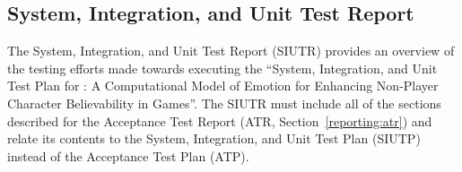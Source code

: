 \subsection{System, Integration, and Unit Test Report}\label{reporting:siutr}
The System, Integration, and Unit Test Report (SIUTR) provides an overview of
the testing efforts made towards executing the ``System, Integration, and Unit
Test Plan for \progname{}: A Computational Model of Emotion for Enhancing
Non-Player Character Believability in Games''. The SIUTR must include all of
the sections described for the Acceptance Test Report (ATR,
Section~\ref{reporting:atr}) and relate its contents to the System,
Integration, and Unit Test Plan (SIUTP) instead of the Acceptance Test Plan
(ATP).